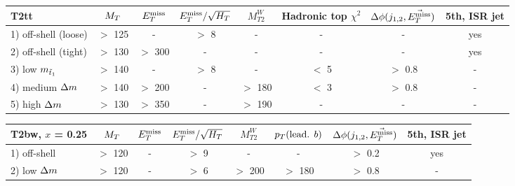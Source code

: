             \begin{table}[!ht]
                {\footnotesize
            \begin{center}
            \hspace*{-0.8cm}
                    \begin{tabular}{|l|ccccccc|}
                        \hline
                        \textbf{T2tt}          & $M_T$   & $E_T^\text{miss}$    & $E_T^\text{miss}/\sqrt{H_T}$  & $M_{T2}^W$ & Hadronic top $\chi^2$ & $\Delta\phi(j_{1,2},\vec{E_T^\text{miss}})$      &   5th, ISR jet \\
                    \hline                                                                                                                                     
                    1) off-shell (loose)       & $>$ 125 & -       &   $>$ 8            &     -     & -             &          - &    yes        \\
                    2) off-shell (tight)       & $>$ 130 & $>$ 300 &   -                &     -     & -        	    &          - &    yes        \\
                    3) low    $m_{\tilde{t}_1}$  & $>$ 140 & -       &   $>$ 8            &     -     &  $<$ 5        &  $>$ 0.8   &    -          \\
                    4) medium $\Delta m$        & $>$ 140 & $>$ 200 &   -                &  $>$ 180  &  $<$ 3        &  $>$ 0.8   &    -          \\
                    5) high   $\Delta m$        & $>$ 130 & $>$ 350 &   -                &  $>$ 190  & -             &          - &    -          \\
                        \hline
                    \end{tabular}
            \hspace*{-0.5cm}
                    \begin{tabular}{|l|ccccccc|}
                        \hline
                        \textbf{T2bw}, $x$ = 0.25        & $M_T$     & $E_T^\text{miss}$    & $E_T^\text{miss}/\sqrt{H_T}$ & $M_{T2}^W$ & $p_T(\text{lead. }b)$ & $\Delta\phi(j_{1,2},\vec{E_T^\text{miss}})$ & 5th, ISR jet  \\
                    \hline                                                                                                                      
                    1) off-shell       & $>$ 120   &  -       &    $>$  9       &     -      &   -                   &  $>$ 0.2      & yes           \\
                    2) low    $\Delta m$ & $>$ 120   &  -       &    $>$  6       &  $>$ 200   & $>$ 180               &  $>$ 0.8      & -             \\

\end{tabular}
\end{center}}
\end{table}
